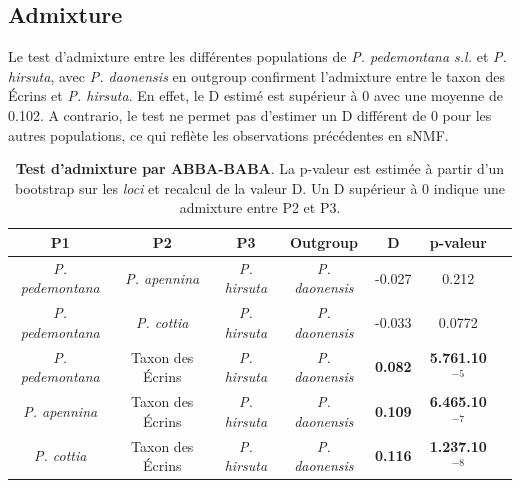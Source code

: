 
\subsection{Admixture}

Le test d'admixture entre les différentes populations de \textit{P. pedemontana s.l.} et \textit{P. hirsuta}, avec \textit{P. daonensis} en outgroup confirment l'admixture entre le taxon des Écrins et \textit{P. hirsuta}. En effet, le D estimé est supérieur à 0 avec une moyenne de 0.102. A contrario, le test ne permet pas d'estimer un D différent de 0 pour les autres populations, ce qui reflète les observations précédentes en sNMF.


\begin{table}
\begin{tabular}{ccccccc}\\\toprule  
P1 & P2 & P3 & Outgroup & D & p-valeur \\ \midrule
\textit{P. pedemontana} & \textit{P. apennina} & \textit{P. hirsuta} & \textit{P. daonensis} & -0.027 & 0.212 \\
\textit{P. pedemontana} & \textit{P. cottia} & \textit{P. hirsuta} & \textit{P. daonensis} & -0.033 & 0.0772 \\ \midrule
\textit{P. pedemontana} & Taxon des Écrins & \textit{P. hirsuta} & \textit{P. daonensis} & \textbf{0.082} & \textbf{5.761.10$^{-5}$} \\
\textit{P. apennina} & Taxon des Écrins & \textit{P. hirsuta} & \textit{P. daonensis} & \textbf{0.109} & \textbf{6.465.10$^{-7}$} \\
\textit{P. cottia} & Taxon des Écrins & \textit{P. hirsuta} & \textit{P. daonensis} & \textbf{0.116} & \textbf{1.237.10$^{-8}$} \\ \bottomrule
\end{tabular}
\caption{\textbf{Test d'admixture par ABBA-BABA}. La p-valeur est estimée à partir d'un bootstrap sur les \textit{loci} et recalcul de la valeur D. Un D supérieur à 0 indique une admixture entre P2 et P3.}
\label{ABBA}
\end{table}

